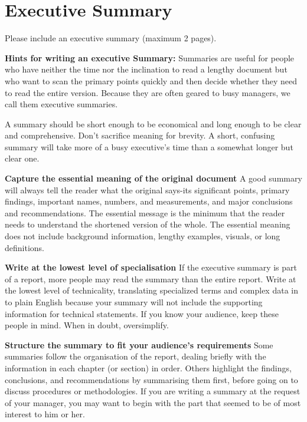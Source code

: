 \chapter*{Executive Summary}

Please include an executive summary (maximum 2 pages).

\textbf{Hints for writing an executive Summary:} 
Summaries are useful for people who have neither the time nor the inclination to
read a lengthy document but who want to scan the primary points quickly and then
decide whether they need to read the entire version. Because they are often
geared to busy managers, we call them executive summaries.

A summary should be short enough to be economical and long enough to be clear and
comprehensive. Don't sacrifice meaning for brevity. A short, confusing summary
will take more of a busy executive's time than a somewhat longer but clear one.

\textbf{Capture the essential meaning of the original document}  
A good summary will always tell the reader what the original says-its significant
points, primary findings, important names, numbers, and measurements, and major
conclusions and recommendations. The essential message is the minimum that the
reader needs to understand the shortened version of the whole. The essential
meaning does not include background information, lengthy examples, visuals, or
long definitions.

\textbf{Write at the lowest level of specialisation}  
If the executive summary is part of a report, more people may read the summary
than the entire report. Write at the lowest level of technicality, translating
specialized terms and complex data in to plain English because your summary will
not include the supporting information for technical statements. If you know your
audience, keep these people in mind. When in doubt, oversimplify.

\textbf{Structure the summary to fit your audience's requirements} 
Some summaries follow the organisation of the report, dealing briefly with the
information in each chapter (or section) in order. Others highlight the findings,
conclusions, and recommendations by summarising them first, before going on to
discuss procedures or methodologies. If you are writing a summary at the request
of your manager, you may want to begin with the part that seemed to be of most
interest to him or her.

